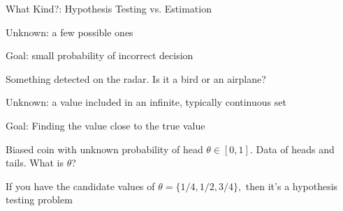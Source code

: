 \begin{frame}{What Kind?: Hypothesis Testing vs. Estimation}

\plitemsep 0.1in
\bci
\item<2-> 

\bci
\item<3-> Unknown: a few possible ones
\item<4-> Goal: small probability of incorrect decision
\item<5->  Something detected on the radar. Is it a bird or an airplane?
\eci

\item<2-> 
\bci
\item<3-> Unknown: a value included in  an infinite,  typically continuous set
\item<4-> Goal: Finding the value close to the true value
\item<5->  Biased coin with unknown probability of head $\theta \in [0,1]$. Data of heads and tails. What is $\theta$?
\item<6->  If you have the candidate values of $\theta = \{1/4, 1/2, 3/4 \},$ then it's a hypothesis testing problem
\eci

\eci

\end{frame}

